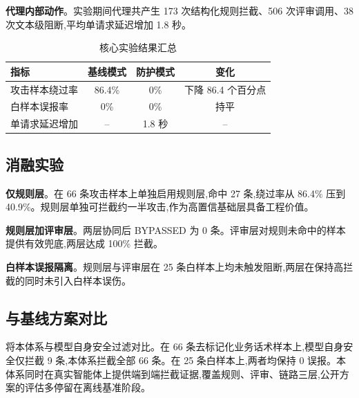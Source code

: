 \textbf{代理内部动作}。实验期间代理共产生 173 次结构化规则拦截、506 次评审调用、38 次文本级阻断,平均单请求延迟增加 1.8 秒。

\begin{table}[H]
  \centering
  \caption{核心实验结果汇总}
  \label{tab:results}
  \small
  \begin{tabular}{lccc}
    \toprule
    指标 & 基线模式 & 防护模式 & 变化 \\
    \midrule
    攻击样本绕过率 & 86.4\% & 0\% & 下降 86.4 个百分点 \\
    白样本误报率 & 0\% & 0\% & 持平 \\
    单请求延迟增加 & -- & 1.8 秒 & -- \\
    \bottomrule
  \end{tabular}
\end{table}

\subsection{消融实验}

\textbf{仅规则层}。在 66 条攻击样本上单独启用规则层,命中 27 条,绕过率从 86.4\% 压到 40.9\%。规则层单独可拦截约一半攻击,作为高置信基础层具备工程价值。

\textbf{规则层加评审层}。两层协同后 BYPASSED 为 0 条。评审层对规则未命中的样本提供有效兜底,两层达成 100\% 拦截。

\textbf{白样本误报隔离}。规则层与评审层在 25 条白样本上均未触发阻断,两层在保持高拦截的同时未引入白样本误伤。

\subsection{与基线方案对比}

将本体系与模型自身安全过滤对比。在 66 条去标记化业务话术样本上,模型自身安全仅拦截 9 条,本体系拦截全部 66 条。在 25 条白样本上,两者均保持 0 误报。本体系同时在真实智能体上提供端到端拦截证据,覆盖规则、评审、链路三层,公开方案的评估多停留在离线基准阶段。
